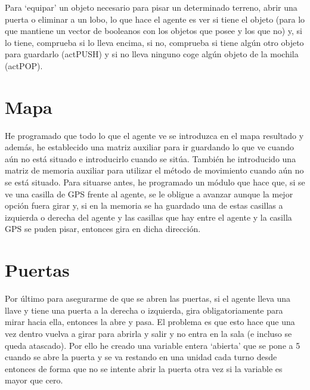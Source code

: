 \documentclass[a4paper, 11pt]{article}
\begin{document}
	Para `equipar' un objeto necesario para pisar un determinado terreno, abrir una puerta o eliminar a un lobo, lo que hace el agente es ver si tiene el objeto (para lo que mantiene un vector de booleanos con los objetos que posee y los que no) y, si lo tiene, comprueba si lo lleva encima, si no, comprueba si tiene algún otro objeto para guardarlo (actPUSH) y si no lleva ninguno coge algún objeto de la mochila (actPOP).

\section{Mapa}
He programado que todo lo que el agente ve se introduzca en el mapa resultado y además, he establecido una matriz auxiliar para ir guardando lo que ve cuando aún no está situado e introducirlo cuando se sitúa. También he introducido una matriz de memoria auxiliar para utilizar el método de movimiento cuando aún no se está situado.
Para situarse antes, he programado un módulo que hace que, si se ve una casilla de GPS frente al agente, se le obligue a avanzar aunque la mejor opción fuera girar y, si en la memoria se ha guardado una de estas casillas a izquierda o derecha del agente y las casillas que hay entre el agente y la casilla GPS se puden pisar, entonces gira en dicha dirección.

\section{Puertas}
Por último para asegurarme de que se abren las puertas, si el agente lleva una llave y tiene una puerta a la derecha o izquierda, gira obligatoriamente para mirar hacia ella, entonces la abre y pasa. El problema es que esto hace que una vez dentro vuelva a girar para abrirla y salir y no entra en la sala (e incluso se queda atascado). Por ello he creado una variable entera `abierta' que se pone a 5 cuando se abre la puerta y se va restando en una unidad cada turno desde entonces de forma que no se intente abrir la puerta otra vez si la variable es mayor que cero. 
\end{document}
